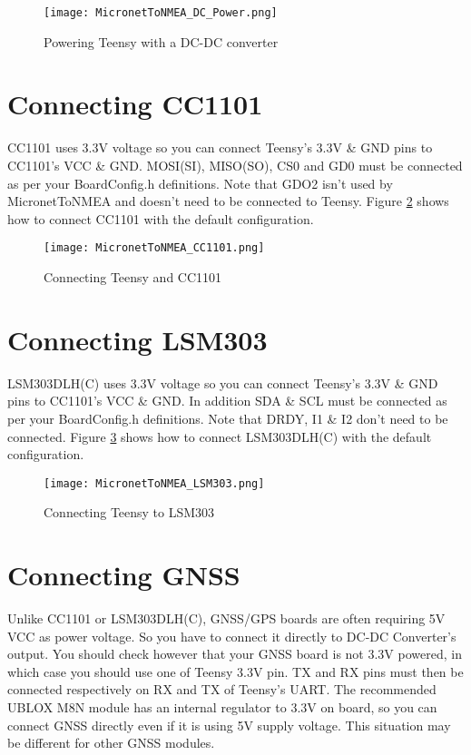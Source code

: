 \documentclass{report}
\begin{document}
\begin{figure}
\centering

\texttt{[image: MicronetToNMEA\_DC\_Power.png]}
	\caption{Powering Teensy with a DC-DC converter}
\label{figure:dcpower}
\end{figure}

\section{Connecting CC1101}

CC1101 uses 3.3V voltage so you can connect Teensy's 3.3V \& GND pins to CC1101's VCC \& GND. MOSI(SI), MISO(SO), CS0 and GD0 must be connected as per your BoardConfig.h definitions. Note that GDO2 isn't used by MicronetToNMEA and doesn't need to be connected to Teensy. Figure \ref{figure:cc1101} shows how to connect CC1101 with the default configuration.

\begin{figure}[h]
	\centering
	\texttt{[image: MicronetToNMEA\_CC1101.png]}
	\caption{Connecting Teensy and CC1101}
	\label{figure:cc1101}
\end{figure}

\section{Connecting LSM303}

LSM303DLH(C) uses 3.3V voltage so you can connect Teensy's 3.3V \& GND pins to CC1101's VCC \& GND. In addition SDA \& SCL must be connected as per your BoardConfig.h definitions. Note that DRDY, I1 \& I2 don't need to be connected. Figure \ref{figure:lsm303} shows how to connect LSM303DLH(C) with the default configuration.

\begin{figure}[h]
	\centering
	\texttt{[image: MicronetToNMEA\_LSM303.png]}
	\caption{Connecting Teensy to LSM303}
	\label{figure:lsm303}
\end{figure}

\section{Connecting GNSS}

Unlike CC1101 or LSM303DLH(C), GNSS/GPS boards are often requiring 5V VCC as power voltage. So you have to connect it directly to DC-DC Converter's output. You should check however that your GNSS board is not 3.3V powered, in which case you should use one of Teensy 3.3V pin.
TX and RX pins must then be connected respectively on RX and TX of Teensy's UART. The recommended UBLOX M8N module has an internal regulator to 3.3V on board, so you can connect GNSS directly even if it is using 5V supply voltage. This situation may be different for other GNSS modules. 
\end{document}
